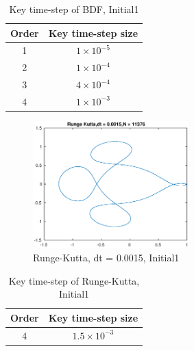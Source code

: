 \documentclass[a4paper,twocolumn]{article}
\theoremstyle{definition}
\begin{document}
\begin{table}[!htp]
	\centering
	\begin{tabular}{|c|c|}
		\hline	
		Order & Key time-step size  \\
		\hline		
		1 & $1\times 10^{-5}$ \\	
		\hline		
		2 & $1\times 10^{-4}$   \\	
		\hline 
		3 & $4\times 10^{-4}$  \\
		\hline
		4 & $1\times 10^{-3}$  \\
		\hline
	\end{tabular}
	\caption{Key time-step of BDF, Initial1}
	\label{tab:test33}
\end{table}
\begin{figure}[!htp]   
	\centering
	\includegraphics[width=6cm]{Pictures/3_4.eps}
	\caption{Runge-Kutta, dt = 0.0015, Initial1}
	\label{fig:RKks}
\end{figure}
\begin{table}[!htp]
	\centering
	\begin{tabular}{|c|c|}
		\hline	
		Order & Key time-step size  \\
		\hline		
		4 & $1.5\times 10^{-3}$ \\	
		\hline		
	\end{tabular}
	\caption{Key time-step of Runge-Kutta, Initial1}
	\label{tab:test34}
\end{table}
\newpage
\end{document}
